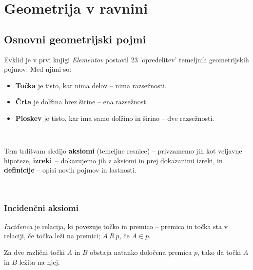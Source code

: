 \chapter{Geometrija v ravnini}

\section{Osnovni geometrijski pojmi}

            
                Evklid je v prvi knjigi \textit{Elementov} postavil $23$ 'opredelitev' temeljnih geometrijskih pojmov.
                Med njimi so:
                \begin{itemize}
                    \item \textbf{Točka} je tisto, kar nima delov -- nima razsežnosti.
                    \item \textbf{Črta} je dolžina brez širine -- ena razsežnost.
                    \item \textbf{Ploskev} je tisto, kar ima samo dolžino in širino -- dve razsežnosti.
                \end{itemize}
            
                ~
            
                Tem trditvam sledijo \textbf{aksiomi} (temeljne resnice) -- privzamemo jih kot veljavne hipoteze,
                 \textbf{izreki}~-- dokazujemo jih z aksiomi in prej dokazanimi izreki, 
                 in \textbf{definicije} -- opisi novih pojmov in lastnosti.
            
        
                ~
        
            \subsection*{Incidenčni aksiomi}

            \begin{definicija}
                \textit{Incidenca} je relacija, ki povezuje točko in premico -- premica in točka sta v relaciji,
                 če točka leži na premici; $A~R~p$, če $A\in p$.
            \end{definicija}

            \begin{aksiom}
                Za dve različni točki $A$ in $B$ obstaja natanko določena premica $p$, tako da točki $A$ in $B$ ležita na njej.
            \end{aksiom}

